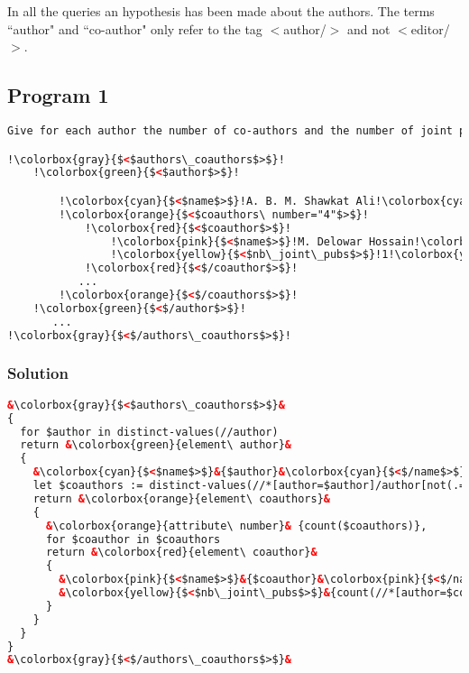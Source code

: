 \documentclass{article}
\begin{document}
In all the queries an hypothesis has been made about the authors. The terms ``author" and ``co-author" only refer to the tag $<$author/$>$ and not $<$editor/$>$.

\subsection{Program 1}
\begin{lstlisting}[language=xml, escapechar=!]
Give for each author the number of co-authors and the number of joint publications with each of them, using the following output format.

!\colorbox{gray}{$<$authors\_coauthors$>$}!
    !\colorbox{green}{$<$author$>$}!

        !\colorbox{cyan}{$<$name$>$}!A. B. M. Shawkat Ali!\colorbox{cyan}{$<$/name$>$}!
        !\colorbox{orange}{$<$coauthors\ number="4"$>$}!
            !\colorbox{red}{$<$coauthor$>$}!
                !\colorbox{pink}{$<$name$>$}!M. Delowar Hossain!\colorbox{pink}{$<$/name$>$}!
                !\colorbox{yellow}{$<$nb\_joint\_pubs$>$}!1!\colorbox{yellow}{$<$/nb\_joint\_pubs$>$}!
            !\colorbox{red}{$<$/coauthor$>$}!
           ...
        !\colorbox{orange}{$<$/coauthors$>$}!
    !\colorbox{green}{$<$/author$>$}!
       ...
!\colorbox{gray}{$<$/authors\_coauthors$>$}!
\end{lstlisting}

\subsubsection{Solution}
\begin{lstlisting}[language=xml, frame=none, escapechar=&]
&\colorbox{gray}{$<$authors\_coauthors$>$}&
{
  for $author in distinct-values(//author)
  return &\colorbox{green}{element\ author}&
  {
    &\colorbox{cyan}{$<$name$>$}&{$author}&\colorbox{cyan}{$<$/name$>$}&,
    let $coauthors := distinct-values(//*[author=$author]/author[not(.=$author)])
    return &\colorbox{orange}{element\ coauthors}&
    {
      &\colorbox{orange}{attribute\ number}& {count($coauthors)},
      for $coauthor in $coauthors
      return &\colorbox{red}{element\ coauthor}&
      {
        &\colorbox{pink}{$<$name$>$}&{$coauthor}&\colorbox{pink}{$<$/name$>$}&,
        &\colorbox{yellow}{$<$nb\_joint\_pubs$>$}&{count(//*[author=$coauthor]/author[.=$author]))}&\colorbox{yellow}{$<$/nb\_joint\_pubs$>$}&
      }
    }
  }
}
&\colorbox{gray}{$<$/authors\_coauthors$>$}&
\end{lstlisting}
\end{document}
